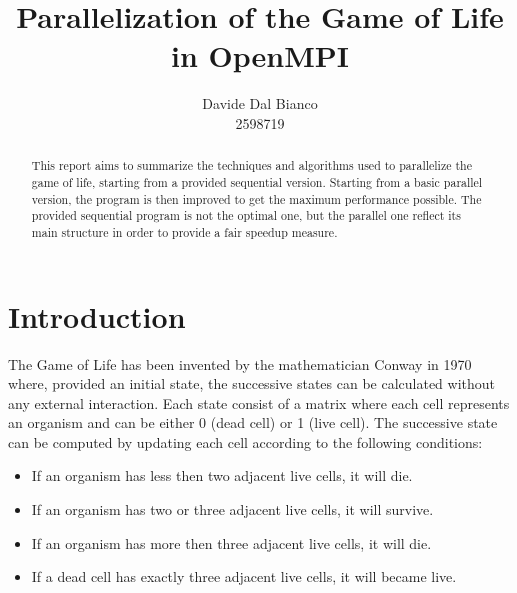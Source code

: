 \documentclass{article}
\title{Parallelization of the Game of Life in OpenMPI}
\author{Davide Dal Bianco \\ 2598719}
\begin{document}
\maketitle

\begin{abstract}
This report aims to summarize the techniques and algorithms used to parallelize the game of life, starting from a provided sequential version. Starting from a basic parallel version, the program is then improved to get the maximum performance possible. The provided sequential program is not the optimal one, but the parallel one reflect its main structure in order to provide a fair speedup measure.
\end{abstract}

\section{Introduction}
The Game of Life has been invented by the mathematician Conway in 1970 where, provided an initial state, the successive states can be calculated without any external interaction. Each state consist of a matrix where each cell represents an organism and can be either 0 (dead cell) or 1 (live cell). The successive state can be computed by updating each cell according to the following conditions:
\begin{itemize}
    \item If an organism has less then two adjacent live cells, it will die.
    \item If an organism has two or three adjacent live cells, it will survive.
    \item If an organism has more then three adjacent live cells, it will die.
    \item If a dead cell has exactly three adjacent live cells, it will became live.
\end{itemize}
\end{document}
